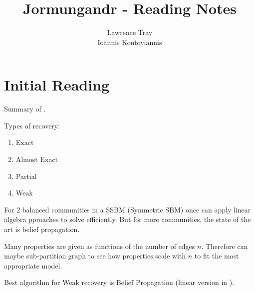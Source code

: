 \documentclass[]{article}
\title{Jormungandr - Reading Notes}
\author{Lawrence Tray \\ Ioannis Kontoyiannis}
\begin{document}
\maketitle

\section{Initial Reading}

Summary of \cite{Abbe}.

Types of recovery:
\begin{enumerate}
	\item Exact
	\item Almost Exact
	\item Partial
	\item Weak
\end{enumerate}

For 2 balanced communities in a SSBM (Symmetric SBM) once can apply linear algebra pproaches to solve efficiently. But for more communities, the state of the art is belief propagation. 

Many properties are given as functions of the number of edges $n$. Therefore can maybe sub-partition graph to see how properties scale with $n$ to fit the most appropriate model.

Best algorithm for Weak recovery is Belief Propagation (linear version in \cite{Linear-ABP}).

\nocite{*}
\printbibliography
\end{document}
